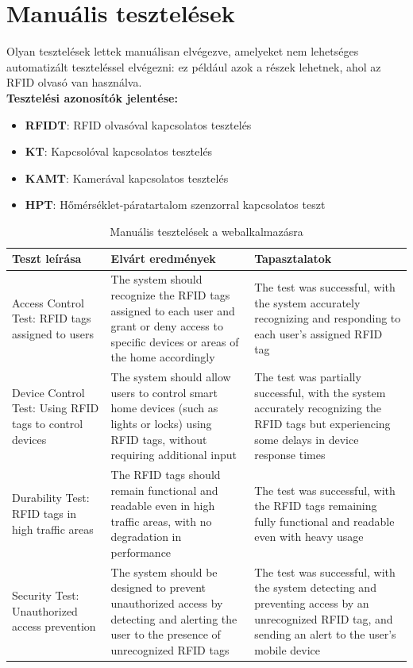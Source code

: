 \documentclass[
]{thesis-ekf}
\theoremstyle{definition}
\theoremstyle{remark}
\begin{document}
	\section{Manuális tesztelések}
	Olyan tesztelések lettek manuálisan elvégezve, amelyeket nem lehetséges automatizált teszteléssel elvégezni: ez például azok a részek lehetnek, ahol az RFID olvasó van használva.\\
	\textbf{Tesztelési azonosítók jelentése:}
	\begin{itemize}
		\item \textbf{RFIDT}: RFID olvasóval kapcsolatos tesztelés
		\item \textbf{KT}: Kapcsolóval kapcsolatos tesztelés
		\item \textbf{KAMT}: Kamerával kapcsolatos tesztelés
		\item \textbf{HPT}: Hőmérséklet-páratartalom szenzorral kapcsolatos teszt
	\end{itemize}
	\begin{table}[ht!]
		\centering
		\begin{tabular}{|p{}|p{}|p{}|}
			\hline
			\textbf{Teszt leírása} & \textbf{Elvárt eredmények} & \textbf{Tapasztalatok} \\
			\hline
			Access Control Test: RFID tags assigned to users &
			 The system should recognize the RFID tags assigned to each user and grant or deny access to specific devices or areas of the home accordingly &
			  The test was successful, with the system accurately recognizing and responding to each user's assigned RFID tag \\
			\hline
			Device Control Test: Using RFID tags to control devices &
			 The system should allow users to control smart home devices (such as lights or locks) using RFID tags, without requiring additional input &
			  The test was partially successful, with the system accurately recognizing the RFID tags but experiencing some delays in device response times \\
			\hline
			Durability Test: RFID tags in high traffic areas &
			 The RFID tags should remain functional and readable even in high traffic areas, with no degradation in performance &
			  The test was successful, with the RFID tags remaining fully functional and readable even with heavy usage \\
			\hline
			Security Test: Unauthorized access prevention &
			 The system should be designed to prevent unauthorized access by detecting and alerting the user to the presence of unrecognized RFID tags & 
			 The test was successful, with the system detecting and preventing access by an unrecognized RFID tag, and sending an alert to the user's mobile device \\
			\hline
		\end{tabular}
		\caption{Manuális tesztelések a webalkalmazásra}
		\label{table:manual-testing-results}
	\end{table}
	
\end{document}
